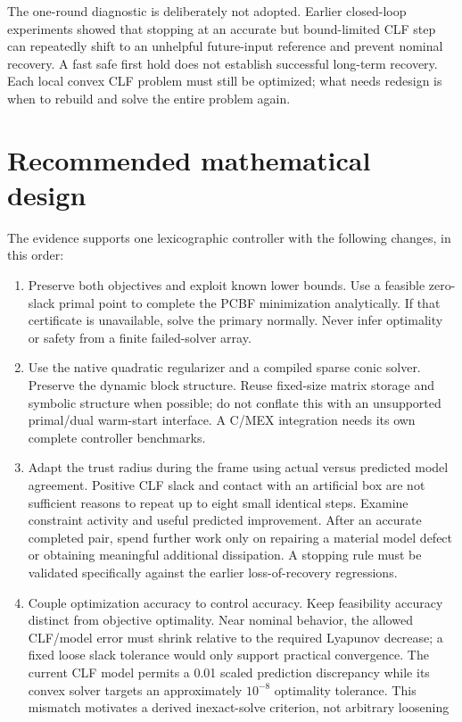 \documentclass[11pt]{article}
\begin{document}
The one-round diagnostic is deliberately not adopted. Earlier closed-loop
experiments showed that stopping at an accurate but bound-limited CLF step
can repeatedly shift to an unhelpful future-input reference and prevent
nominal recovery. A fast safe first hold does not establish successful
long-term recovery. Each local convex CLF problem must still be optimized;
what needs redesign is when to rebuild and solve the entire problem again.

\section{Recommended mathematical design}
The evidence supports one lexicographic controller with the following changes,
in this order:
\begin{enumerate}
\item Preserve both objectives and exploit known lower bounds. Use a feasible
zero-slack primal point to complete the PCBF minimization analytically. If that
certificate is unavailable, solve the primary normally. Never infer optimality
or safety from a finite failed-solver array.
\item Use the native quadratic regularizer and a compiled sparse conic solver.
Preserve the dynamic block structure. Reuse fixed-size matrix storage and
symbolic structure when possible; do not conflate this with an unsupported
primal/dual warm-start interface. A C/MEX integration needs its own complete
controller benchmarks.
\item Adapt the trust radius during the frame using actual versus predicted
model agreement. Positive CLF slack and contact with an artificial box are not
sufficient reasons to repeat up to eight small identical steps. Examine
constraint activity and useful predicted improvement. After an accurate
completed pair, spend further work only on repairing a material model defect
or obtaining meaningful additional dissipation. A stopping rule must be
validated specifically against the earlier loss-of-recovery regressions.
\item Couple optimization accuracy to control accuracy. Keep feasibility
accuracy distinct from objective optimality. Near nominal behavior, the
allowed CLF/model error must shrink relative to the required Lyapunov decrease;
a fixed loose slack tolerance would only support practical convergence.
The current CLF model permits a 0.01 scaled prediction discrepancy while its
convex solver targets an approximately $10^{-8}$ optimality tolerance. This
mismatch motivates a derived inexact-solve criterion, not arbitrary loosening

\end{enumerate}
\end{document}

